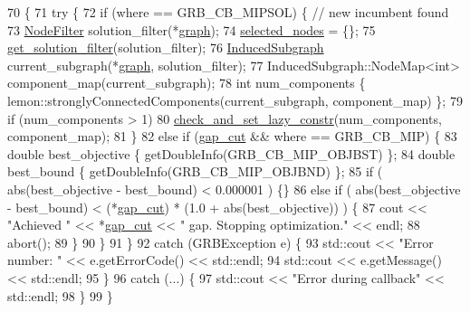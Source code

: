 \begin{DoxyCode}
70                                       \{
71     \textcolor{keywordflow}{try} \{
72         \textcolor{keywordflow}{if} (where == GRB\_CB\_MIPSOL) \{ \textcolor{comment}{// new incumbent found}
73             \hyperlink{namespacederegnet_a50db1f8fc7c6a954d825d9e1ed9ad302}{NodeFilter} solution\_filter(*\hyperlink{classderegnet_1_1LazyConstraintCallback_af481c9d68dea2dab035e1f2f79cda4d5}{graph});
74             \hyperlink{classderegnet_1_1LazyConstraintCallback_a5ddc4662e6e5c9f1d191c15edbefaa9b}{selected\_nodes} = \{\};
75             \hyperlink{classderegnet_1_1LazyConstraintCallback_aebc9854e98523c99d3f856ff71bb86fb}{get\_solution\_filter}(solution\_filter);
76             \hyperlink{namespacederegnet_ad1e0ad2af7b91e41fc1d8a15a1da5041}{InducedSubgraph} current\_subgraph(*\hyperlink{classderegnet_1_1LazyConstraintCallback_af481c9d68dea2dab035e1f2f79cda4d5}{graph}, solution\_filter);
77             InducedSubgraph::NodeMap<int> component\_map(current\_subgraph);
78             \textcolor{keywordtype}{int} num\_components \{ lemon::stronglyConnectedComponents(current\_subgraph, component\_map) \};
79             \textcolor{keywordflow}{if} (num\_components > 1)
80                 \hyperlink{classderegnet_1_1LazyConstraintCallback_a02eb39d4ea843597aa7c3382f17af874}{check\_and\_set\_lazy\_constr}(num\_components, component\_map);
81         \}
82         \textcolor{keywordflow}{else} \textcolor{keywordflow}{if} (\hyperlink{classderegnet_1_1LazyConstraintCallback_a6a139307165523fa944e393e01aeec47}{gap\_cut} && where == GRB\_CB\_MIP) \{
83             \textcolor{keywordtype}{double} best\_objective \{ getDoubleInfo(GRB\_CB\_MIP\_OBJBST) \};
84             \textcolor{keywordtype}{double} best\_bound \{ getDoubleInfo(GRB\_CB\_MIP\_OBJBND) \};
85             \textcolor{keywordflow}{if} ( abs(best\_objective - best\_bound) < 0.000001 ) \{\}
86             \textcolor{keywordflow}{else} \textcolor{keywordflow}{if} ( abs(best\_objective - best\_bound) < (*\hyperlink{classderegnet_1_1LazyConstraintCallback_a6a139307165523fa944e393e01aeec47}{gap\_cut}) * (1.0 + abs(best\_objective)) ) 
      \{
87                 cout << \textcolor{stringliteral}{"Achieved "} << *\hyperlink{classderegnet_1_1LazyConstraintCallback_a6a139307165523fa944e393e01aeec47}{gap\_cut} << \textcolor{stringliteral}{" gap. Stopping optimization."} << endl;
88                 abort();
89             \}
90         \}
91     \}
92     \textcolor{keywordflow}{catch} (GRBException e) \{
93         std::cout << \textcolor{stringliteral}{"Error number: "} << e.getErrorCode() << std::endl;
94         std::cout << e.getMessage() << std::endl;
95     \}
96     \textcolor{keywordflow}{catch} (...) \{
97         std::cout << \textcolor{stringliteral}{"Error during callback"} << std::endl;
98     \}
99 \}
\end{DoxyCode}
